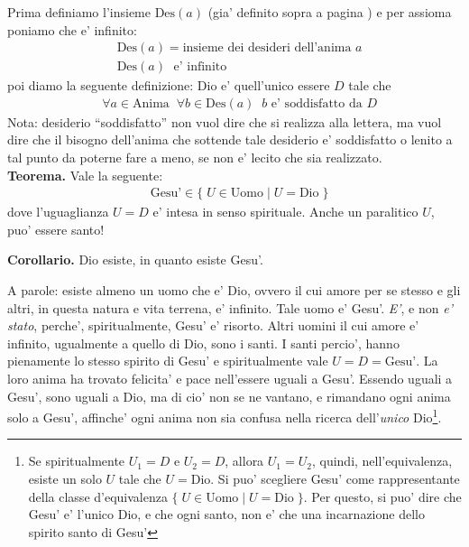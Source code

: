 Prima definiamo l'insieme $\textrm{Des}(a)$ (gia' definito sopra a pagina \pageref{defDiDesideriDes}) e per assioma poniamo che e' infinito:
    \begin{align*}
        &\textrm{Des}(a) = \textrm{insieme dei desideri dell'anima } a\\
        &\textrm{Des}(a)\;\textrm{ e' infinito }
    \end{align*}
    poi diamo la seguente definizione: Dio e' quell'unico essere $D$ tale che
    \begin{align*}
        &\forall a \in \textrm{Anima}\;\;\forall b \in \textrm{Des}(a)\;\;b \textrm{ e' soddisfatto da }D
    \end{align*}
    Nota: desiderio ``soddisfatto'' non vuol dire che si realizza alla lettera, ma vuol dire che il bisogno dell'anima che sottende tale desiderio e' soddisfatto o lenito a tal punto da poterne fare a meno, se non e' lecito che sia realizzato.\\

    \textbf{Teorema.} Vale la seguente:
    \begin{align*}
        &\textrm{Gesu'}\in \{ \;U\in\textrm{Uomo}\;|\;U=\textrm{Dio}\;\}
    \end{align*}
    dove l'uguaglianza $U=D$ e' intesa in senso spirituale. Anche un paralitico $U$, puo' essere santo!

    \textbf{Corollario. } Dio esiste, in quanto esiste Gesu'.

    A parole: esiste almeno un uomo che e' Dio, ovvero il cui amore per se stesso e gli altri, in questa natura e vita terrena, e' infinito. Tale uomo e' Gesu'. \emph{E'}, e non \emph{e' stato}, perche', spiritualmente, Gesu' e' risorto. Altri uomini il cui amore e' infinito, ugualmente a quello di Dio, sono i santi. I santi percio', hanno pienamente lo stesso spirito di Gesu' e spiritualmente vale $U=D=\textrm{Gesu'}$. La loro anima ha trovato felicita' e pace nell'essere uguali a Gesu'. Essendo uguali a Gesu', sono uguali a Dio, ma di cio' non se ne vantano, e rimandano ogni anima solo a Gesu', affinche' ogni anima non sia confusa nella ricerca dell'\emph{unico} Dio\footnote{Se spiritualmente $U_1=D$ e $U_2=D$, allora $U_1=U_2$, quindi, nell'equivalenza, esiste un solo $U$ tale che $U=\textrm{Dio}$. Si puo' scegliere Gesu' come rappresentante della classe d'equivalenza $\{ \;U\in\textrm{Uomo}\;|\;U=\textrm{Dio}\;\}$. Per questo, si puo' dire che Gesu' e' l'unico Dio, e che ogni santo, non e' che una incarnazione dello spirito santo di Gesu'}.

